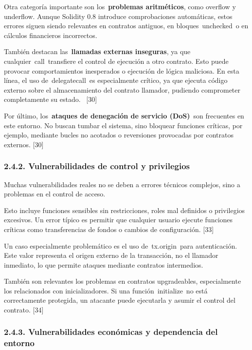 Otra categoría importante son los~\textbf{problemas aritméticos}, como
overflow y underflow. Aunque Solidity 0.8 introduce comprobaciones
automáticas, estos errores siguen siendo relevantes en contratos
antiguos, en bloques~unchecked~o en cálculos financieros incorrectos.

También destacan las~\textbf{llamadas externas inseguras}, ya que
cualquier~call~transfiere el control de ejecución a otro contrato. Esto
puede provocar comportamientos inesperados o ejecución de lógica
maliciosa. En esta línea, el uso de~delegatecall~es especialmente
crítico, ya que ejecuta código externo sobre el almacenamiento del
contrato llamador, pudiendo comprometer completamente su estado.~
{[}30{]}

Por último, los~\textbf{ataques de denegación de servicio (DoS)}~son
frecuentes en este entorno. No buscan tumbar el sistema, sino bloquear
funciones críticas, por ejemplo, mediante bucles no acotados o
reversiones provocadas por contratos externos. {[}30{]}

\subsubsection{2.4.2. Vulnerabilidades de control y
privilegios}\label{vulnerabilidades-de-control-y-privilegios}

Muchas vulnerabilidades reales no se deben a errores técnicos complejos,
sino a problemas en el control de acceso.

Esto incluye funciones sensibles sin restricciones, roles mal definidos
o privilegios excesivos. Un error típico es permitir que cualquier
usuario ejecute funciones críticas como transferencias de fondos o
cambios de configuración. {[}33{]}

Un caso especialmente problemático es el uso de~tx.origin~para
autenticación. Este valor representa el origen externo de la
transacción, no el llamador inmediato, lo que permite ataques mediante
contratos intermedios.

También son relevantes los problemas en contratos upgradeables,
especialmente los relacionados con inicializadores. Si una
función~initialize~no está correctamente protegida, un atacante puede
ejecutarla y asumir el control del contrato. {[}34{]}

\subsubsection{2.4.3. Vulnerabilidades económicas y dependencia del
entorno}\label{vulnerabilidades-econuxf3micas-y-dependencia-del-entorno}

